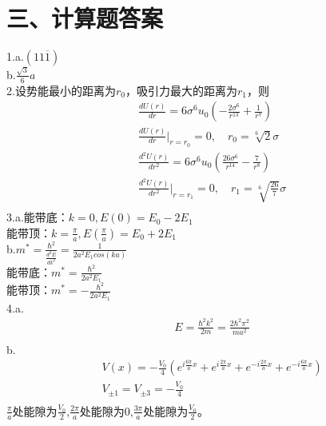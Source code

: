 \documentclass[UTF8]{ctexart}
\begin{document}
\section*{\bfseries 三、计算题答案}
1.a.$(11\overline{1})$\\
b.$\frac{\sqrt3}{6}a$\\
2.设势能最小的距离为$r_0$，吸引力最大的距离为$r_1$，则
\begin{equation*}
    \begin{aligned}
        &\frac{dU(r)}{dr}=6\sigma^6u_0(-\frac{2\sigma^6}{r^{13}}+\frac{1}{r^7})\\
        &\frac{dU(r)}{dr}\Bigg\lvert_{r=r_0}=0,\quad r_0=\sqrt[6]{2}\sigma\\
        &\frac{d^2U(r)}{dr^2}=6\sigma^6u_0(\frac{26\sigma^6}{r^{14}}-\frac{7}{r^8})\\
        &\frac{d^2U(r)}{dr^2}\Bigg\lvert_{r=r_1}=0,\quad r_1=\sqrt[6]{\frac{26}{7}}\sigma\\
    \end{aligned}
\end{equation*}
3.a.能带底：$k=0,E(0)=E_0-2E_1$\\
能带顶：$k=\frac{\pi}{a},E(\frac{\pi}{a})=E_0+2E_1$\\
b.$m^*=\frac{\hbar^2}{\frac{d^2E}{dk^2}}=\frac{1}{2a^2E_1cos(ka)}$\\
能带底：$m^*=\frac{\hbar^2}{2a^2E_1}$\\
能带顶：$m^*=-\frac{\hbar^2}{2a^2E_1}$\\
4.a.
\begin{equation*}
    \begin{aligned}
        & E=\frac{\hbar^2k^2}{2m}=\frac{2\hbar^2\pi^2}{ma^2}\\
    \end{aligned}
\end{equation*}
b.
\begin{equation*}
    \begin{aligned}
        & V(x)=-\frac{V_0}{4}(e^{i\frac{6\pi}{a}x}+e^{i\frac{2\pi}{a}x}+e^{-i\frac{2\pi}{a}x}+e^{-i\frac{6\pi}{a}x})\\
        & V_{\pm1}=V_{\pm3}=-\frac{V_0}{4}\\
    \end{aligned}
\end{equation*}
$\frac{\pi}{a}$处能隙为$\frac{V_0}{2}$,$\frac{2\pi}{a}$处能隙为$0$,$\frac{3\pi}{a}$处能隙为$\frac{V_0}{2}$。\\
\end{document}
